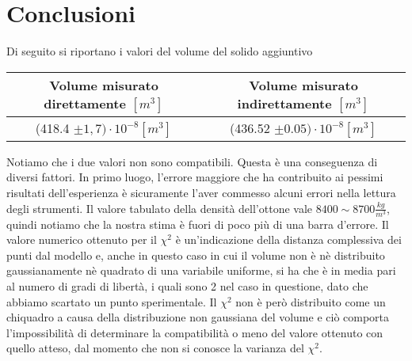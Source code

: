 \documentclass{article}
\begin{document}
\section{Conclusioni}
Di seguito si riportano i valori del volume del solido aggiuntivo 
\vspace{1em}
\begin{center}
	\begin{tabular}{cc}
		\hline
	Volume misurato direttamente $[m^{3}]$	& Volume misurato indirettamente $[m^{3}]$ \\
		\hline
	(418.4 $\pm 1,7)\cdot10^{-8} [m^{3}]$	& (436.52 $\pm 0.05)\cdot10^{-8} [m^{3}] $ \\
		\hline
	\end{tabular}
\end{center}
\vspace{1em}
Notiamo che i due valori non sono compatibili. Questa è una conseguenza di diversi fattori. In primo luogo, l'errore maggiore che ha contribuito ai pessimi risultati dell'esperienza è sicuramente l'aver commesso alcuni errori nella lettura degli strumenti.
Il valore tabulato della densità dell'ottone vale $8400 \sim 8700 \frac{kg}{m^{3}}$, quindi notiamo che la nostra stima è fuori di poco più di una barra d'errore.
Il valore numerico ottenuto per il $\chi^{2}$ è un'indicazione della distanza complessiva dei punti dal modello e, anche in questo caso in cui il volume non è nè distribuito gaussianamente nè quadrato di una variabile uniforme, si ha che è in media pari al numero di gradi di libertà, i quali sono 2 nel caso in questione, dato che abbiamo scartato un punto sperimentale.
Il $\chi^{2}$ non è però distribuito come un chiquadro a causa della distribuzione non gaussiana del volume e ciò comporta l'impossibilità di determinare la compatibilità o meno del valore ottenuto con quello atteso, dal momento che non si conosce la varianza del $\chi^{2}$.
\end{document}
